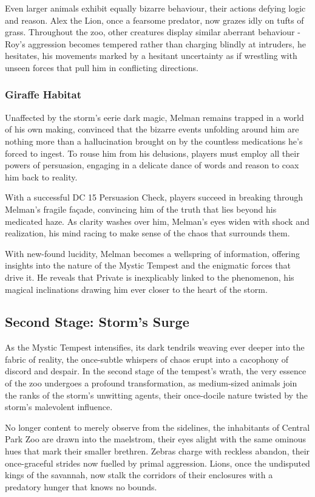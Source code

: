 Even larger animals exhibit equally bizarre behaviour, their actions defying logic and reason. Alex the Lion, once a fearsome predator, now grazes idly on tufts of grass. Throughout the zoo, other creatures display similar aberrant behaviour - Roy's aggression becomes tempered rather than charging blindly at intruders, he hesitates, his movements marked by a hesitant uncertainty as if wrestling with unseen forces that pull him in conflicting directions.\\\hfill

\subsubsection*{ Giraffe Habitat}
Unaffected by the storm's eerie dark magic, Melman remains trapped in a world of his own making, convinced that the bizarre events unfolding around him are nothing more than a hallucination brought on by the countless medications he's forced to ingest. To rouse him from his delusions, players must employ all their powers of persuasion, engaging in a delicate dance of words and reason to coax him back to reality.

With a successful DC 15 Persuasion Check, players succeed in breaking through Melman's fragile façade, convincing him of the truth that lies beyond his medicated haze. As clarity washes over him, Melman's eyes widen with shock and realization, his mind racing to make sense of the chaos that surrounds them.

With new-found lucidity, Melman becomes a wellspring of information, offering insights into the nature of the Mystic Tempest and the enigmatic forces that drive it. He reveals that Private is inexplicably linked to the phenomenon, his magical inclinations drawing him ever closer to the heart of the storm.

\subsection*{Second Stage: Storm's Surge}
As the Mystic Tempest intensifies, its dark tendrils weaving ever deeper into the fabric of reality, the once-subtle whispers of chaos erupt into a cacophony of discord and despair. In the second stage of the tempest's wrath, the very essence of the zoo undergoes a profound transformation, as medium-sized animals join the ranks of the storm's unwitting agents, their once-docile nature twisted by the storm's malevolent influence.

No longer content to merely observe from the sidelines, the inhabitants of Central Park Zoo are drawn into the maelstrom, their eyes alight with the same ominous hues that mark their smaller brethren. Zebras charge with reckless abandon, their once-graceful strides now fuelled by primal aggression. Lions, once the undisputed kings of the savannah, now stalk the corridors of their enclosures with a predatory hunger that knows no bounds.

